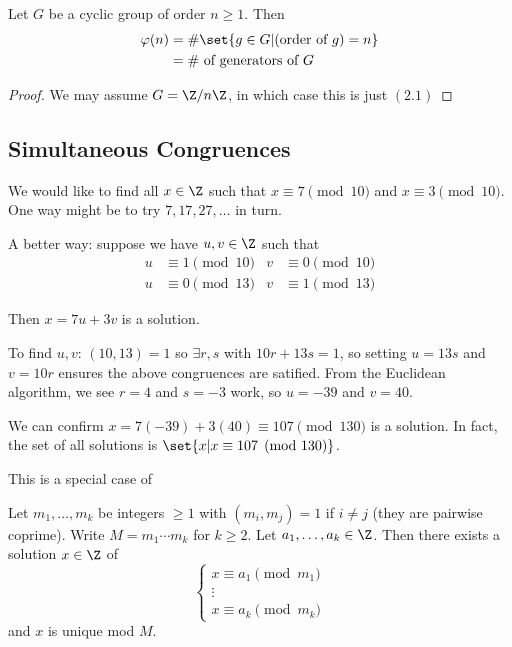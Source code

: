 \documentclass{article}
\begin{document}

\begin{nlemma}\label{lem:2_2}
    Let $G$ be a cyclic group of order $n \geq 1$. Then
    \begin{align*}
        \varphi (n) &=  \# \set{g \in G | (\text{order of } g) = n} \\
                    &=  \# \text{ of generators of } G
    \end{align*}
\end{nlemma}

\begin{proof}
    We may assume $G = \Z/ n \Z$, in which case this is just $(2.1)$
\end{proof}

\subsection{Simultaneous Congruences}

\begin{eg}
    We would like to find all $x \in \Z$ such that $x \equiv 7 \pmod{10}$ and $x \equiv 3 \pmod{10}$.
    One way might be to try $7, 17, 27, \dotsc$ in turn.

    A better way: suppose we have $u, v \in \Z$ such that
    \begin{align*}
        u &\equiv 1 \pmod{10} & v &\equiv 0 \pmod{10} \\
        u &\equiv 0 \pmod{13} & v &\equiv 1 \pmod{13}
    \end{align*}

    Then $x = 7u + 3v$ is a solution.

    To find $u, v$: $(10, 13) = 1$ so $\exists r, s$ with $10r + 13s = 1$, so setting $u=13s$ and $v=10r$ ensures the above congruences are satified.  From the Euclidean algorithm, we see $r=4$ and $s=-3$ work, so $u=-39$ and $v=40$.

    We can confirm  $x = 7(-39) + 3(40) \equiv 107 \pmod{130}$ is a solution.
    In fact, the set of all solutions is $ \set{ x | x \equiv 107 \pmod {130}} $.
\end{eg}

This is a special case of

\begin{thm}
    Let $m_1, \dotsc, m_k$ be integers $\geq 1$ with $(m_i, m_j) = 1$ if $i \neq j$ (they are pairwise coprime).
    Write $M = m_1 \dotsm m_k$ for $k \geq 2$. Let $a_1, \dotsc, a_k \in \Z$. Then there exists a solution $x \in \Z$ of
    \begin{equation}\label{eq:crt}
        \begin{cases}
            x \equiv a_1 \pmod{m_1} \\ \vdots \\ x \equiv a_k \pmod{m_k}
        \end{cases}
    \end{equation}
    and $x$ is unique mod $M$.
\end{thm}
\end{document}
